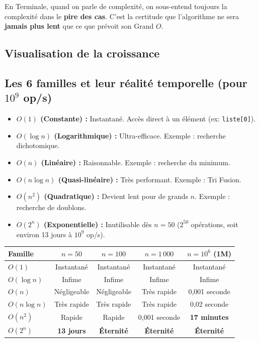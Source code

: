 \begin{Definition}
En Terminale, quand on parle de complexité, on sous-entend toujours la complexité dans le \textbf{pire des cas}. C'est la certitude que l'algorithme ne sera \textbf{jamais plus lent} que ce que prévoit son Grand $O$.
\end{Definition}

\subsection*{Visualisation de la croissance}


\subsection*{Les 6 familles et leur réalité temporelle (pour $10^9$ op/s)}

\begin{itemize}
    \item \textbf{$O(1)$ (Constante) :} Instantané. Accès direct à un élément (ex: \texttt{liste[0]}).
    \item \textbf{$O(\log n)$ (Logarithmique) :} Ultra-efficace. Exemple : recherche dichotomique.
    \item \textbf{$O(n)$ (Linéaire) :} Raisonnable. Exemple : recherche du minimum.
    \item \textbf{$O(n \log n)$ (Quasi-linéaire) :} Très performant. Exemple : Tri Fusion.
    \item \textbf{$O(n^2)$ (Quadratique) :}  Devient lent pour de grands $n$. Exemple : recherche de doublons.
    \item \textbf{$O(2^n)$ (Exponentielle) :} Inutilisable dès $n = 50$ ($2^{50}$ opérations, soit environ 13 jours à $10^9$ op/s).
\end{itemize}

\begin{center}
\renewcommand{\arraystretch}{1.5}
\begin{tabular}{|l|c|c|c|c|}
     \hline
     \textbf{Famille} & \textbf{$n=50$} & \textbf{$n=100$} & \textbf{$n=1\,000$} & \textbf{$n=10^6$ (1M)} \\ \hline
     $O(1)$ & Instantané & Instantané & Instantané & Instantané \\ \hline
     $O(\log n)$ & Infime & Infime & Infime & Infime \\ \hline
     $O(n)$ & Négligeable & Négligeable & Très rapide & 0,001 seconde \\ \hline
     $O(n \log n)$ & Très rapide & Très rapide & Très rapide & 0,02 seconde \\ \hline
     $O(n^2)$ & Rapide & Rapide & 0,001 seconde & \textbf{17 minutes} \\ \hline
     $O(2^n)$ & \textbf{13 jours} & \textbf{Éternité} & \textbf{Éternité} & \textbf{Éternité} \\ \hline
\end{tabular}
\end{center}


